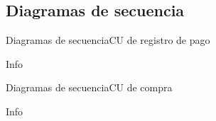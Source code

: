 %
%
%

\subsection{Diagramas de secuencia}

\begin{frame}{Diagramas de secuencia}{CU de registro de pago}
  
  Info


\end{frame}

\begin{frame}{Diagramas de secuencia}{CU de compra}
  
  Info


\end{frame}

